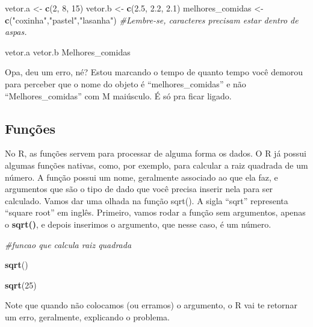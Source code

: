 \documentclass[
]{book}
\newenvironment{Shaded}{\begin{snugshade}}{\end{snugshade}}
\newcommand{\CommentTok}[1]{\textcolor[rgb]{0.56,0.35,0.01}{\textit{#1}}}
\newcommand{\DecValTok}[1]{\textcolor[rgb]{0.00,0.00,0.81}{#1}}
\newcommand{\FloatTok}[1]{\textcolor[rgb]{0.00,0.00,0.81}{#1}}
\newcommand{\FunctionTok}[1]{\textcolor[rgb]{0.13,0.29,0.53}{\textbf{#1}}}
\newcommand{\NormalTok}[1]{#1}
\newcommand{\OtherTok}[1]{\textcolor[rgb]{0.56,0.35,0.01}{#1}}
\newcommand{\StringTok}[1]{\textcolor[rgb]{0.31,0.60,0.02}{#1}}
\begin{document}
\begin{Shaded}
\begin{Highlighting}[]
\NormalTok{vetor.a }\OtherTok{\textless{}{-}} \FunctionTok{c}\NormalTok{(}\DecValTok{2}\NormalTok{, }\DecValTok{8}\NormalTok{, }\DecValTok{15}\NormalTok{)}
\NormalTok{vetor.b }\OtherTok{\textless{}{-}} \FunctionTok{c}\NormalTok{(}\FloatTok{2.5}\NormalTok{, }\FloatTok{2.2}\NormalTok{, }\FloatTok{2.1}\NormalTok{)}
\NormalTok{melhores\_comidas }\OtherTok{\textless{}{-}} \FunctionTok{c}\NormalTok{(}\StringTok{"coxinha"}\NormalTok{,}\StringTok{"pastel"}\NormalTok{,}\StringTok{"lasanha"}\NormalTok{) }\CommentTok{\#Lembre{-}se, caracteres precisam estar dentro de aspas.}

\NormalTok{vetor.a}
\NormalTok{vetor.b}
\NormalTok{Melhores\_comidas}
\end{Highlighting}
\end{Shaded}

Opa, deu um erro, né? Estou marcando o tempo de quanto tempo você demorou para perceber que o nome do objeto é ``melhores\_comidas'' e não ``Melhores\_comidas'' com M maiúsculo. É só pra ficar ligado.

\hypertarget{funuxe7uxf5es}{%
\subsection{Funções}\label{funuxe7uxf5es}}

No R, as funções servem para processar de alguma forma os dados. O R já possui algumas funções nativas, como, por exemplo, para calcular a raiz quadrada de um número. A função possui um nome, geralmente associado ao que ela faz, e argumentos que são o tipo de dado que você precisa inserir nela para ser calculado. Vamos dar uma olhada na função sqrt(). A sigla ``sqrt'' representa ``square root'' em inglês. Primeiro, vamos rodar a função sem argumentos, apenas o \textbf{sqrt()}, e depois inserimos o argumento, que nesse caso, é um número.

\begin{Shaded}
\begin{Highlighting}[]
\CommentTok{\#funcao que calcula raiz quadrada}

\FunctionTok{sqrt}\NormalTok{()}

\FunctionTok{sqrt}\NormalTok{(}\DecValTok{25}\NormalTok{)}
\end{Highlighting}
\end{Shaded}

Note que quando não colocamos (ou erramos) o argumento, o R vai te retornar um erro, geralmente, explicando o problema.
\end{document}
